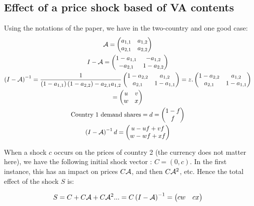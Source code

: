 \documentclass[11pt,a4paper]{article}
\begin{document}
\begin{appendices}
\subsection{Effect of a price shock based of VA contents}
Using the notations of the paper, we have in the two-country and one good case:
\begin{gather*}
\cal {A} = \left(\begin{matrix}a_{1,1}&a_{1,2}\\a_{2,1}&a_{2,2}\end{matrix}\right)
\\
I-\cal {A}=\left(\begin{matrix}1-a_{1,1}&-a_{1,2}\\-a_{2,1}&1-a_{2,2}\end{matrix}\right)
\\
\left(I-\cal {A}\right)^{-1}=\frac{1}{\left(1-a_{1,1}\right)\left(1-a_{2,2}\right)-a_{2,1}a_{1,2}}\left(\begin{matrix}1-a_{2,2}&a_{1,2}\\a_{2,1}&1-a_{1,1}\end{matrix}\right) =z.\left(\begin{matrix}1-a_{2,2}&a_{1,2}\\a_{2,1}&1-a_{1,1}\end{matrix}\right) \\ 
=\left(\begin{matrix}u&v\\w&x\end{matrix}\right)
\\
\text{Country 1 demand shares}=d=\left(\begin{matrix}1-f\\f\end{matrix}\right) \\
\left(I-\cal {A}\right)^{-1}d=\left(\begin{matrix}u-uf+vf\\w-wf+xf\end{matrix}\right)
\end{gather*}

When a shock $c$ occurs on the prices of country 2 (the currency does not matter here), we have the following initial shock vector : $C=\left(0,c\right)$.
In the first instance, this has an impact on prices $C\cal {A}$, and then $C{\cal{A}}^{2}$, etc.
Hence the total effect of the shock $S$ is: 


\begin{equation*}
S=C+C{\cal{A}}+C{\cal{A}}^{2}...=C\left(I-{\cal{A}}\right)^{-1}=\left(\begin{matrix}cw  &   cx\end{matrix}\right)
\end{equation*}


\end{appendices}
\end{document}
